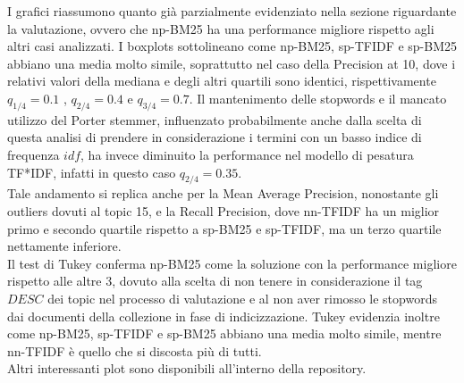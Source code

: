\documentclass[a4paper, 11pt]{article}
\begin{document}
\noindent
I grafici riassumono quanto già parzialmente evidenziato nella sezione riguardante la valutazione, ovvero che np-BM25 ha una performance migliore rispetto agli altri casi analizzati. I boxplots sottolineano come np-BM25, sp-TFIDF e sp-BM25 abbiano una media molto simile, soprattutto nel caso della Precision at 10, dove i relativi valori della mediana e degli altri quartili sono identici, rispettivamente $q_{1/4}=0.1$ , $q_{2/4}=0.4$ e $q_{3/4}=0.7$. Il mantenimento delle stopwords e il mancato utilizzo del Porter stemmer, influenzato probabilmente anche dalla scelta di questa analisi di prendere in considerazione i termini con un basso indice di frequenza $idf$, ha invece diminuito la performance nel modello di pesatura TF*IDF, infatti in questo caso $q_{2/4}=0.35$.\\
Tale andamento si replica anche per la Mean Average Precision, nonostante gli outliers dovuti al topic 15, e la Recall Precision, dove nn-TFIDF ha un miglior primo e secondo quartile rispetto a sp-BM25 e sp-TFIDF, ma un terzo quartile nettamente inferiore.\\
Il test di Tukey conferma np-BM25 come la soluzione con la performance migliore rispetto alle altre 3, dovuto alla scelta di non tenere in considerazione il tag $DESC$ dei topic nel processo di valutazione e al non aver rimosso le stopwords dai documenti della collezione in fase di indicizzazione. Tukey evidenzia inoltre come np-BM25, sp-TFIDF e sp-BM25 abbiano una media molto simile, mentre nn-TFIDF è quello che si discosta più di tutti.\\
Altri interessanti plot sono disponibili all'interno della repository.
\end{document}
